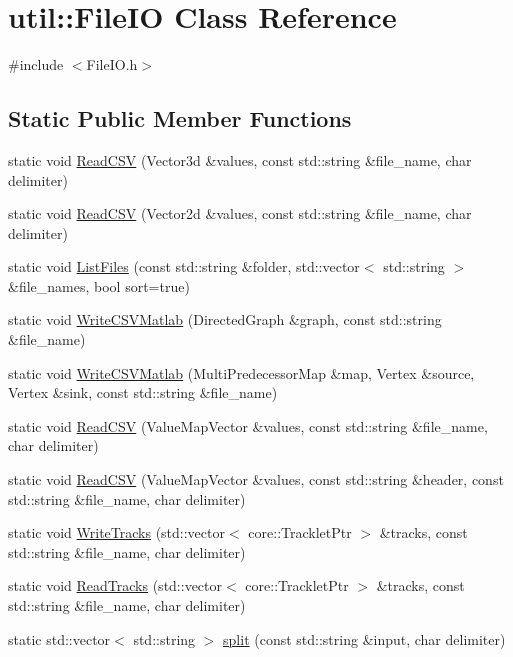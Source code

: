 \hypertarget{classutil_1_1FileIO}{}\section{util\+:\+:File\+IO Class Reference}
\label{classutil_1_1FileIO}


{\ttfamily \#include $<$File\+I\+O.\+h$>$}

\subsection*{Static Public Member Functions}
\begin{DoxyCompactItemize}
\item 
static void \hyperlink{classutil_1_1FileIO_ae31b9e693316483eda89df8463ea0d0a}{Read\+C\+SV} (Vector3d \&values, const std\+::string \&file\+\_\+name, char delimiter)
\item 
static void \hyperlink{classutil_1_1FileIO_a49f014af1e0f03d290f00049e082d9c6}{Read\+C\+SV} (Vector2d \&values, const std\+::string \&file\+\_\+name, char delimiter)
\item 
static void \hyperlink{classutil_1_1FileIO_a6e290e22083d49619b757bfca96a51fa}{List\+Files} (const std\+::string \&folder, std\+::vector$<$ std\+::string $>$ \&file\+\_\+names, bool sort=true)
\item 
static void \hyperlink{classutil_1_1FileIO_a5f2730a95e0801faa32e49dae9b86544}{Write\+C\+S\+V\+Matlab} (Directed\+Graph \&graph, const std\+::string \&file\+\_\+name)
\item 
static void \hyperlink{classutil_1_1FileIO_a2833554dcdf4a04f9fe67a324b5815ff}{Write\+C\+S\+V\+Matlab} (Multi\+Predecessor\+Map \&map, Vertex \&source, Vertex \&sink, const std\+::string \&file\+\_\+name)
\item 
static void \hyperlink{classutil_1_1FileIO_a642616eb6f07c71bd8dcb1585a532d92}{Read\+C\+SV} (Value\+Map\+Vector \&values, const std\+::string \&file\+\_\+name, char delimiter)
\item 
static void \hyperlink{classutil_1_1FileIO_a59b96733490d7b60e4f107da84efb245}{Read\+C\+SV} (Value\+Map\+Vector \&values, const std\+::string \&header, const std\+::string \&file\+\_\+name, char delimiter)
\item 
static void \hyperlink{classutil_1_1FileIO_a57059c9b52e86c753db5da6281cf23c6}{Write\+Tracks} (std\+::vector$<$ core\+::\+Tracklet\+Ptr $>$ \&tracks, const std\+::string \&file\+\_\+name, char delimiter)
\item 
static void \hyperlink{classutil_1_1FileIO_aa6294f669bdb86510c8b6cefed9ac44b}{Read\+Tracks} (std\+::vector$<$ core\+::\+Tracklet\+Ptr $>$ \&tracks, const std\+::string \&file\+\_\+name, char delimiter)
\item 
static std\+::vector$<$ std\+::string $>$ \hyperlink{classutil_1_1FileIO_aa79e018874aa1da4d0b2cd1e5b7d2e01}{split} (const std\+::string \&input, char delimiter)
\end{DoxyCompactItemize}


